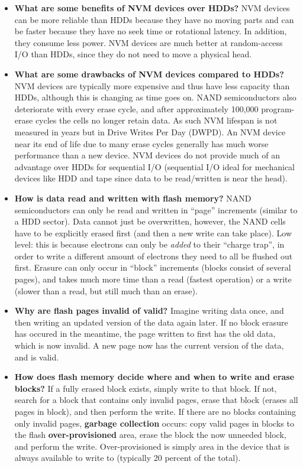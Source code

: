 \documentclass[12pt]{article}
\begin{document}
\begin{itemize}
    \item \textbf{What are some benefits of NVM devices over HDDs?} NVM devices can be more reliable than HDDs because they have no moving parts and can be faster because they have no seek time or rotational latency. In addition, they consume less power. NVM devices are much better at random-access I/O than HDDs, since they do not need to move a physical head.
    \item \textbf{What are some drawbacks of NVM devices compared to HDDs?} NVM devices are typically more expensive and thus have less capacity than HDDs, although this is changing as time goes on. NAND semiconductors also deteriorate with every erase cycle, and after approximately 100,000 program-erase cycles the cells no longer retain data. As such NVM lifespan is not measured in years but in Drive Writes Per Day (DWPD). An NVM device near its end of life due to many erase cycles generally has much worse performance than a new device. NVM devices do not provide much of an advantage over HDDs for sequential I/O (sequential I/O ideal for mechanical devices like HDD and tape since data to be read/written is near the head).
    \item \textbf{How is data read and written with flash memory?} NAND semiconductors can only be read and written in ``page'' increments (similar to a HDD sector). Data cannot just be overwritten, however, the NAND cells have to be explicitly erased first (and then a new write can take place). Low level: this is because electrons can only be \textit{added} to their ``charge trap'', in order to write a different amount of electrons they need to all be flushed out first. Erasure can only occur in ``block'' increments (blocks consist of several pages), and takes much more time than a read (fastest operation) or a write (slower than a read, but still much than an erase).
    \item \textbf{Why are flash pages invalid of valid?} Imagine writing data once, and then writing an updated version of the data again later. If no block erasure has occured in the meantime, the page written to first has the old data, which is now invalid. A new page now has the current version of the data, and is valid.
    \item \textbf{How does flash memory decide where and when to write and erase blocks?} If a fully erased block exists, simply write to that block. If not, search for a block that contains only invalid pages, erase that block (erases all pages in block), and then perform the write. If there are no blocks containing only invalid pages, \textbf{garbage collection} occurs: copy valid pages in blocks to the flash \textbf{over-provisioned} area, erase the block the now unneeded block, and perform the write. Over-provisioned is simply area in the device that is always available to write to (typically 20 percent of the total).

\end{itemize}
\end{document}
